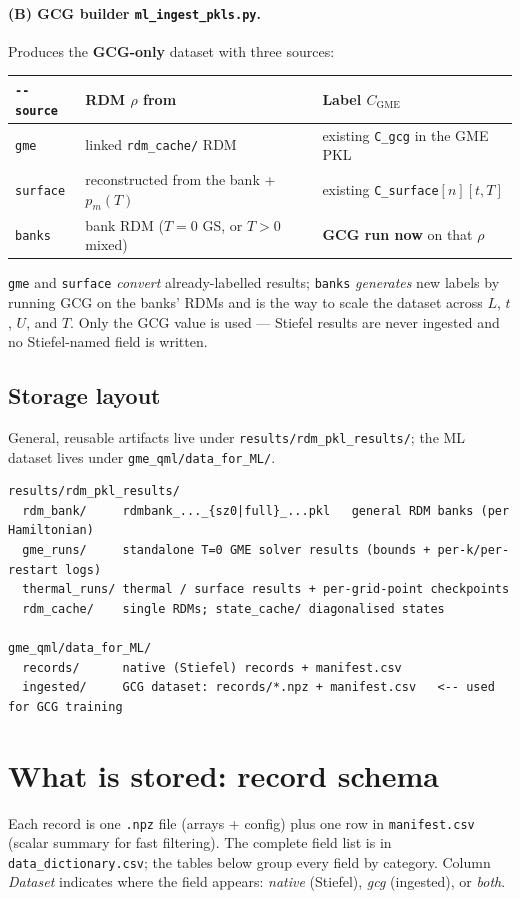 \documentclass[11pt]{article}
\newcommand{\code}[1]{\texttt{\small #1}}
\newcommand{\CGME}{\ensuremath{C_{\mathrm{GME}}}}
\begin{document}
\paragraph{(B) GCG builder \code{ml\_ingest\_pkls.py}.}
Produces the \textbf{GCG-only} dataset with three sources:
\begin{center}
\begin{tabular}{@{}lll@{}}
\toprule
\code{-{}-source} & RDM $\rho$ from & Label \CGME{} \\
\midrule
\code{gme}     & linked \code{rdm\_cache/} RDM       & existing \code{C\_gcg} in the GME PKL \\
\code{surface} & reconstructed from the bank + $p_m(T)$ & existing \code{C\_surface}$[n][t,T]$ \\
\code{banks}   & bank RDM ($T{=}0$ GS, or $T{>}0$ mixed) & \textbf{GCG run now} on that $\rho$ \\
\bottomrule
\end{tabular}
\end{center}
\code{gme} and \code{surface} \emph{convert} already-labelled results; \code{banks}
\emph{generates} new labels by running GCG on the banks' RDMs and is the way to
scale the dataset across $L$, $t$, $U$, and $T$. Only the GCG value is used ---
Stiefel results are never ingested and no Stiefel-named field is written.

\subsection{Storage layout}
General, reusable artifacts live under \code{results/rdm\_pkl\_results/}; the ML
dataset lives under \code{gme\_qml/data\_for\_ML/}.
\begin{Verbatim}[fontsize=\small]
results/rdm_pkl_results/
  rdm_bank/     rdmbank_..._{sz0|full}_...pkl   general RDM banks (per Hamiltonian)
  gme_runs/     standalone T=0 GME solver results (bounds + per-k/per-restart logs)
  thermal_runs/ thermal / surface results + per-grid-point checkpoints
  rdm_cache/    single RDMs; state_cache/ diagonalised states

gme_qml/data_for_ML/
  records/      native (Stiefel) records + manifest.csv
  ingested/     GCG dataset: records/*.npz + manifest.csv   <-- used for GCG training
\end{Verbatim}

\section{What is stored: record schema}\label{sec:schema}
Each record is one \code{.npz} file (arrays + config) plus one row in
\code{manifest.csv} (scalar summary for fast filtering). The complete field list
is in \code{data\_dictionary.csv}; the tables below group every field by
category. Column \emph{Dataset} indicates where the field appears: \emph{native}
(Stiefel), \emph{gcg} (ingested), or \emph{both}.
\end{document}
